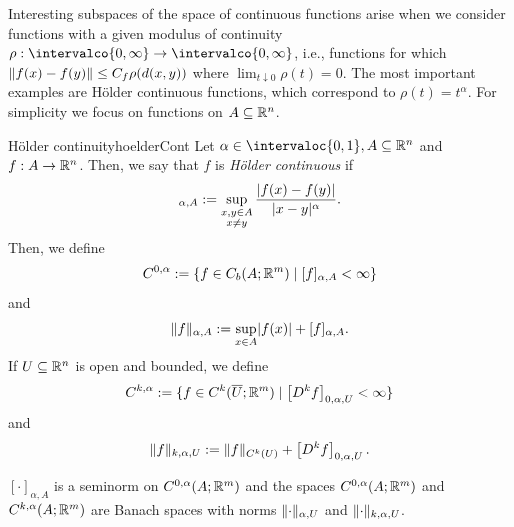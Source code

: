 \documentclass[language=english]{../../Template/TemplateLecture}
\begin{document}
Interesting subspaces of the space of continuous functions arise when we consider functions with a given modulus of continuity $\rho : \intervalco{0,\infty} \to \intervalco{0,\infty}$, i.e., functions for which $\lVert f(x) - f(y)\rVert \leq C_f \rho(d(x,y))$ where $\lim_{t \downarrow 0} \rho(t) = 0$. The most important examples are Hölder continuous functions, which correspond to $\rho(t) = t^\alpha$. For simplicity we focus on functions on $A \subseteq \mathbb{R}^n$.

\begin{defi}{Hölder continuity}{hoelderCont}
    Let $\alpha \in \intervaloc{0,1}, A \subseteq \IR^n$ and $f: A \to \mathbb{R}^n$. Then, we say that $f$ is \emph{Hölder continuous} if 
    \begin{equation}
        [f]_{\alpha,A} := \sup_{\substack{x,y \in A \\ x \neq y}} \frac{\abs{f(x) - f(y)}}{\abs{x - y}^\alpha}.
    \end{equation}
    Then, we define
    \begin{equation}
        C^{0,\alpha} := \{f \in C_b(A; \mathbb{R}^m) \mid [f]_{\alpha, A} < \infty\}
    \end{equation}
    and
    \begin{equation}
        \lVert f\rVert_{\alpha, A} := \sup_{x \in A} \lvert f(x)\rvert + [f]_{\alpha,A}.
    \end{equation}
    If $U \subseteq \mathbb{R}^n$ is open and bounded, we define 
    \begin{equation}
        C^{k,\alpha} := \{f \in C^k(\overline{U}; \mathbb{R}^m) \mid \left[D^k f\right]_{0,\alpha,U} < \infty\}
    \end{equation}
    and 
    \begin{equation}
        \lVert f\rVert_{k,\alpha,U} := \lVert f\rVert_{C^k(U)} + \left[ D^k f \right]_{0,\alpha,U}.
    \end{equation}
\end{defi}

\begin{prop}
    $[\cdot]_{\alpha,A}$ is a seminorm on $C^{0,\alpha}(A; \mathbb{R}^m)$ and the spaces $C^{0,\alpha}(A; \mathbb{R}^m)$ and $C^{k,\alpha}(A; \mathbb{R}^m)$ are Banach spaces with norms $\lVert\cdot\rVert_{\alpha,U}$ and $\lVert\cdot\rVert_{k,\alpha,U}$.
\end{prop}

\end{document}
